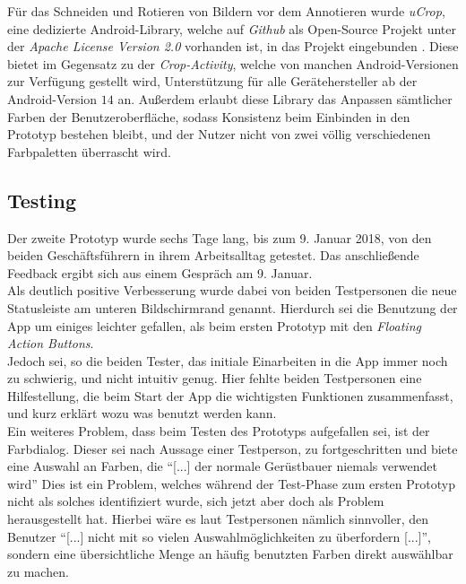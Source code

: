 Für das Schneiden und Rotieren von Bildern vor dem Annotieren wurde \emph{uCrop}, eine dedizierte Android-Library, welche auf \emph{Github} als Open-Source Projekt unter der \emph{Apache License Version 2.0} vorhanden ist, in das Projekt eingebunden \citep{UC18}.
Diese bietet im Gegensatz zu der \emph{Crop-Activity}, welche von manchen Android-Versionen zur Verfügung gestellt wird, Unterstützung für alle Gerätehersteller ab der Android-Version $14$ an.
Außerdem erlaubt diese Library das Anpassen sämtlicher Farben der Benutzeroberfläche, sodass Konsistenz beim Einbinden in den Prototyp bestehen bleibt, und der Nutzer nicht von zwei völlig verschiedenen Farbpaletten überrascht wird. 

\subsection{Testing}\label{subsec:test2}
Der zweite Prototyp wurde sechs Tage lang, bis zum 9. Januar 2018, von den beiden Geschäftsführern in ihrem Arbeitsalltag getestet.
Das anschließende Feedback ergibt sich aus einem Gespräch am 9. Januar. \\

Als deutlich positive Verbesserung wurde dabei von beiden Testpersonen die neue Statusleiste am unteren Bildschirmrand genannt.
Hierdurch sei die Benutzung der App um einiges leichter gefallen, als beim ersten Prototyp mit den \emph{Floating Action Buttons}. \\

Jedoch sei, so die beiden Tester, das initiale Einarbeiten in die App immer noch zu schwierig, und nicht intuitiv genug.
Hier fehlte beiden Testpersonen eine Hilfestellung, die beim Start der App die wichtigsten Funktionen zusammenfasst, und kurz erklärt wozu was benutzt werden kann. \\

Ein weiteres Problem, dass beim Testen des Prototyps aufgefallen sei, ist der Farbdialog.
Dieser sei nach Aussage einer Testperson, zu fortgeschritten und biete eine Auswahl an Farben, die ``[...] der normale Gerüstbauer niemals verwendet wird'' 
Dies ist ein Problem, welches während der Test-Phase zum ersten Prototyp nicht als solches identifiziert wurde, sich jetzt aber doch als Problem herausgestellt hat.
Hierbei wäre es laut Testpersonen nämlich sinnvoller, den Benutzer ``[...] nicht mit so vielen Auswahlmöglichkeiten zu überfordern [...]'', sondern eine übersichtliche Menge an häufig benutzten Farben direkt auswählbar zu machen. \\

